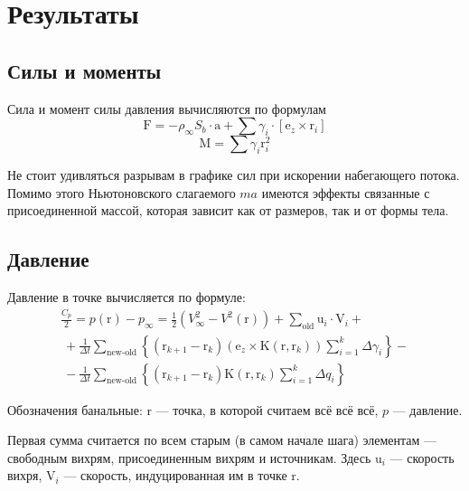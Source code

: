 \documentclass[14pt]{extreport}
\newcommand{\br}[1]{\boldsymbol{\mathrm{#1}}}
\begin{document}
\section{Результаты}
\subsection{Силы и моменты}

Сила и момент силы давления вычисляются по формулам 
\begin{equation*}
\br F = - \rho_\infty S_b \cdot \br a + \sum {\gamma_i \cdot [\br e_z \times \br r_i]}
\end{equation*}\begin{equation*}
\br M = \sum {\gamma_i \br r_i^2}
\end{equation*}

Не стоит удивляться разрывам в графике сил при искорении набегающего потока. Помимо этого Ньютоновского слагаемого $ma$ имеются эффекты связанные с присоединенной массой, которая зависит как от размеров, так и от формы тела.

\subsection{Давление}
Давление в точке вычисляется по формуле:
\begin{multline*}
\frac{C_p}{2} = p(\br r) - p_\infty = \frac{1}{2} \left( V^2_\infty - V^2(\br r) \right) 
+\sum\limits_\text{old}{\br u_i \cdot \br V_i} + \\
\
+\frac{1}{\Delta t}\sum\limits_\text{new-old}
{\left\lbrace\left( \br r_{k+1} - \br r_k \right)\left( \br e_z \times \br K(\br r, \br r_k) \right)
\sum_{i=1}^k{\Delta\gamma_i}\right\rbrace} - \\
\
- \frac{1}{\Delta t}\sum\limits_\text{new-old}
{\left\lbrace\left( \br r_{k+1} - \br r_k \right)
\br K(\br r, \br r_k) \sum_{i=1}^k{\Delta q_i}\right\rbrace}
\end{multline*}

Обозначения банальные: $\br r$ --- точка, в которой считаем всё всё всё,
$p$ --- давление.

Первая сумма считается по всем старым (в самом начале шага) элементам ---
свободным вихрям, присоединенным вихрям и источникам. Здесь
$\br u_i$ --- скорость вихря,
$\br V_i$ --- скорость, индуцированная им в точке $\br r$.
\end{document}

